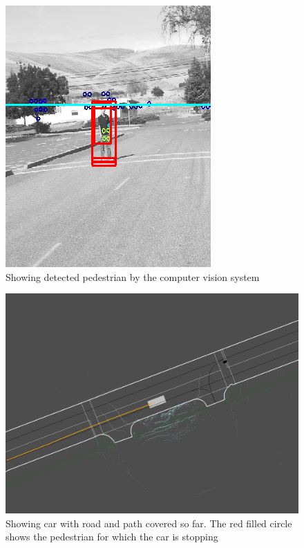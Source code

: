 \documentclass[letterpaper, 10 pt, conference]{ieeeconf}  %
\begin{document}
\begin{figure}[thpb]
  \centering
  \includegraphics[width=0.5\columnwidth]{graphics/ped2.png}
  \caption{Showing detected pedestrian by the computer vision system}
  \label{fig:ped}
\end{figure}


\begin{figure}[thpb]
  \centering
  \includegraphics[width=1.0\columnwidth]{graphics/screenshot-objectmap.png}
  \caption{Showing car with road and path covered so far. The red filled circle shows the pedestrian for which the car is stopping}
  \label{fig:car}
\end{figure}
\end{document}
